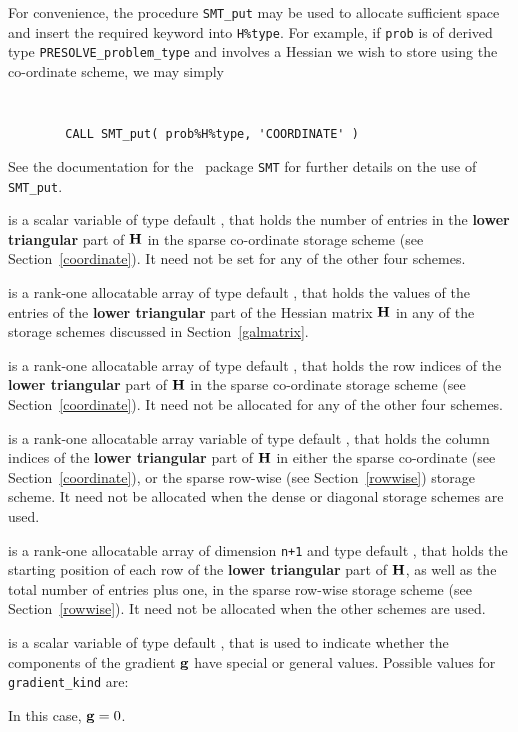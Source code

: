 \documentclass{galahad}
\newcommand{\packagename}{PRESOLVE}
\begin{document}
\begin{description}
\begin{description}
For convenience, the procedure {\tt SMT\_put}
may be used to allocate sufficient space and insert the required keyword
into {\tt H\%type}.
For example, if {\tt prob} is of derived type {\tt \packagename\_problem\_type}
and involves a Hessian we wish to store using the co-ordinate scheme,
we may simply
{\tt
\begin{verbatim}
        CALL SMT_put( prob%H%type, 'COORDINATE' )
\end{verbatim}
}
\noindent
See the documentation for the \galahad\ package {\tt SMT}
for further details on the use of {\tt SMT\_put}.

 is a scalar variable of type default \integer, that
holds the number of entries in the {\bf lower triangular} part of ${\mathbf{H}}$
in the sparse co-ordinate storage scheme (see Section~\ref{coordinate}).
It need not be set for any of the other four schemes.

 is a rank-one allocatable array of type default \realdp, that holds
the values of the entries of the {\bf lower triangular} part
of the Hessian matrix ${\mathbf{H}}$ in any of the
storage schemes discussed in Section~\ref{galmatrix}.

 is a rank-one allocatable array of type default \integer,
that holds the row indices of the {\bf lower triangular} part of ${\mathbf{H}}$
in the sparse co-ordinate storage
scheme (see Section~\ref{coordinate}).
It need not be allocated for any of the other four schemes.

 is a rank-one allocatable array variable of type default \integer,
that holds the column indices of the {\bf lower triangular} part of
${\mathbf{H}}$ in either the sparse co-ordinate
(see Section~\ref{coordinate}), or the sparse row-wise
(see Section~\ref{rowwise}) storage scheme.
It need not be allocated when the dense or diagonal storage schemes are used.

 is a rank-one allocatable array of dimension {\tt n+1} and type
default \integer, that holds the starting position of
each row of the {\bf lower triangular} part of ${\mathbf{H}}$, as well
as the total number of entries plus one, in the sparse row-wise storage
scheme (see Section~\ref{rowwise}). It need not be allocated when the
other schemes are used.

\end{description}

 is a scalar variable of type default \integer,
that is used to indicate whether the components of the gradient ${\mathbf{g}}$
have special or general values. Possible values for {\tt gradient\_kind} are:
\begin{description}
  In this case, ${\mathbf{g}} = 0$.


\end{description}
\end{description}
\end{document}
